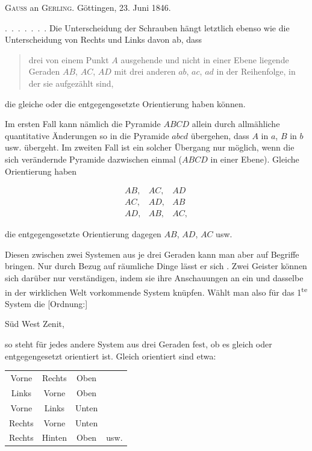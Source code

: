 %
\begin{center}
\textsc{Gauss} an \textsc{Gerling}. Göttingen, 23. Juni 1846.
\end{center}

\mbox{.\ .\ .\ .\ .\ .\ .} Die Unterscheidung der Schrauben hängt letztlich ebenso wie die Unterscheidung von Rechts und Links davon ab, dass

\begin{quote}
drei von einem Punkt $A$ ausgehende und nicht in einer Ebene liegende Geraden $AB$, $AC$, $AD$ mit drei anderen $ab$, $ac$, $ad$ in der Reihenfolge, in der sie aufgezählt sind,
\end{quote}

\begin{center}
die gleiche oder die entgegengesetzte Orientierung haben können.
\end{center}

Im ersten Fall kann nämlich die Pyramide $ABCD$ allein durch allmähliche quantitative Änderungen so in die Pyramide $abcd$ übergehen, dass $A$ in $a$, $B$ in $b$ usw. übergeht. Im zweiten Fall ist ein solcher Übergang nur möglich, wenn die sich verändernde Pyramide dazwischen einmal  ($ABCD$ in einer Ebene). Gleiche Orientierung haben

\[
\begin{array}{ccc}
AB,&AC,&AD\\
AC,&AD,&AB\\
AD,&AB,&AC,
\end{array}
\]

die entgegengesetzte Orientierung dagegen $AB$, $AD$, $AC$ usw.

Diesen  zwischen zwei Systemen aus je drei Geraden kann man aber  auf Begriffe bringen. Nur durch Bezug auf  räumliche Dinge lässt er sich . Zwei Geister können sich darüber nur verständigen, indem sie ihre Anschauungen an ein und dasselbe in der wirklichen Welt vorkommende System knüpfen. Wählt man also für das 1\textsuperscript{te} System die [Ordnung:]

\begin{center}
Süd \qquad West \qquad Zenit,
\end{center}

so steht für jedes andere System aus drei Geraden fest, ob es gleich oder entgegengesetzt orientiert ist. Gleich orientiert sind etwa:

\begin{center}
\begin{tabular}{cccc}
Vorne & Rechts & Oben & \\
Links & Vorne & Oben & \\
Vorne & Links & Unten & \\
Rechts & Vorne & Unten & \\
Rechts & Hinten & Oben & usw.
\end{tabular}
\end{center}
